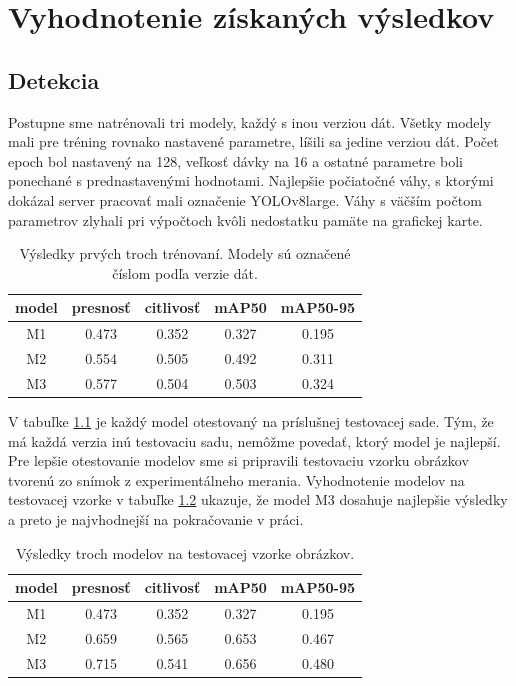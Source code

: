 \chapter{Vyhodnotenie získaných výsledkov}\label{chap:results}

\section{Detekcia}

Postupne sme natrénovali tri modely, každý s inou verziou dát. Všetky modely mali pre tréning rovnako nastavené parametre, líšili sa jedine verziou dát. Počet epoch bol nastavený na 128, veľkosť dávky na 16 a ostatné parametre boli ponechané s prednastavenými hodnotami. Najlepšie počiatočné váhy, s ktorými dokázal server pracovať mali označenie YOLOv8large. Váhy s väčším počtom parametrov zlyhali pri výpočtoch kvôli nedostatku pamäte na grafickej karte.
\\
\begin{table}[ht]
\centering
\begin{tabular}{ |c c c c c| }
\hline
model & presnosť & citlivosť & mAP50 & mAP50-95 \\
\hline
M1  & 0.473 & 0.352	& 0.327	& 0.195 \\
M2  & 0.554	& 0.505	& 0.492	& 0.311 \\
M3  & 0.577	& 0.504	& 0.503	& 0.324 \\
\hline
\end{tabular}
\caption{Výsledky prvých troch trénovaní. Modely sú označené číslom podľa verzie dát.}
\label{table:test1}
\end{table}

V tabuľke \ref{table:test1} je každý model otestovaný na príslušnej testovacej sade. Tým, že má každá verzia inú testovaciu sadu, nemôžme povedať, ktorý model je najlepší. Pre lepšie otestovanie modelov sme si pripravili testovaciu vzorku obrázkov tvorenú zo snímok z experimentálneho merania. Vyhodnotenie modelov na testovacej vzorke v tabuľke \ref{table:test2} ukazuje, že model M3 dosahuje najlepšie výsledky a preto je najvhodnejší na pokračovanie v práci.
\\
\begin{table}[ht]
\centering
\begin{tabular}{ |c c c c c|  }
\hline
model & presnosť & citlivosť & mAP50 & mAP50-95 \\ 
\hline
M1  & 0.473	& 0.352	& 0.327	& 0.195 \\
M2  & 0.659 & 0.565 & 0.653 & 0.467 \\
M3  & 0.715 & 0.541 & 0.656 & 0.480 \\
\hline
\end{tabular}
\caption{Výsledky troch modelov na testovacej vzorke obrázkov.}
\label{table:test2}
\end{table}


